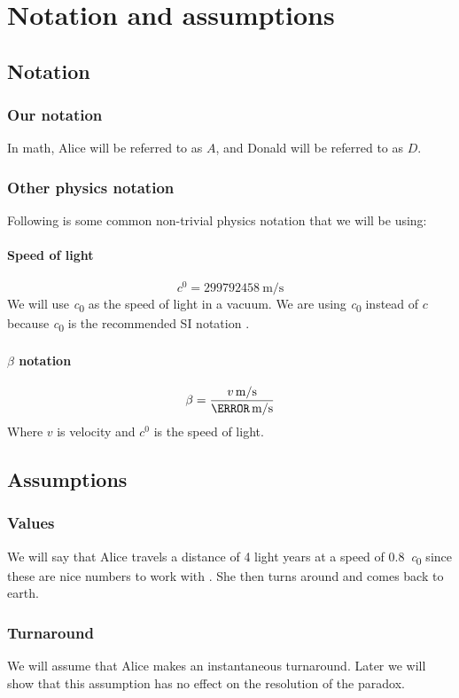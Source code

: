 	\section{Notation and assumptions}
		\subsection{Notation}
			\subsubsection{Our notation}
				In math, Alice will be referred to as $A$, and Donald will be referred to as $D$.
			\subsubsection{Other physics notation}
			Following is some common non-trivial physics notation that we will be using:
			\paragraph{Speed of light}
				\[\si{\clight} = \SI{299792458}{\metre/\second}\]
				We will use \si{\clight} as the speed of light in a vacuum. We are using \si{\clight} instead of $c$ because \si{\clight} is the recommended SI notation \autocite{siunits}.
			\paragraph{$\beta$ notation}
				\[\beta = \frac{\varSI{v}{\metre/\second}}{\varSI{\clight}{\metre/\second}}\]
				Where $v$ is velocity and $\si{\clight}$ is the speed of light.
		\subsection{Assumptions}\label{subsec:twinAssumptions}
			\subsubsection{Values}
				We will say that Alice travels a distance of 4 light years at a speed of \SI{0.8}{\clight} since these are nice numbers to work with \autocite[\pno~35]{kogut2012introduction}.
				She then turns around and comes back to earth.
			\subsubsection{Turnaround}
				We will assume that Alice makes an instantaneous turnaround.
				Later we will show that this assumption has no effect on the resolution of the paradox.
